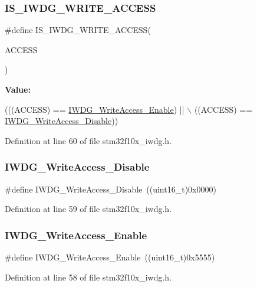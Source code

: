 \subsubsection{\texorpdfstring{I\+S\+\_\+\+I\+W\+D\+G\+\_\+\+W\+R\+I\+T\+E\+\_\+\+A\+C\+C\+E\+SS}{IS\_IWDG\_WRITE\_ACCESS}}
{\footnotesize\ttfamily \#define I\+S\+\_\+\+I\+W\+D\+G\+\_\+\+W\+R\+I\+T\+E\+\_\+\+A\+C\+C\+E\+SS(\begin{DoxyParamCaption}\item[{}]{A\+C\+C\+E\+SS }\end{DoxyParamCaption})}

{\bfseries Value\+:}
\begin{DoxyCode}
(((ACCESS) == \hyperlink{group___i_w_d_g___write_access_ga86f4b926f4351e19ea069f98c2e65f91}{IWDG\_WriteAccess\_Enable}) || \(\backslash\)
                                      ((ACCESS) == \hyperlink{group___i_w_d_g___write_access_ga4b395cf5b2d7ab18fc71a5f779f758cc}{IWDG\_WriteAccess\_Disable}))
\end{DoxyCode}


Definition at line 60 of file stm32f10x\+\_\+iwdg.\+h.

\mbox{\label{group___i_w_d_g___write_access_ga4b395cf5b2d7ab18fc71a5f779f758cc}} 
\subsubsection{\texorpdfstring{I\+W\+D\+G\+\_\+\+Write\+Access\+\_\+\+Disable}{IWDG\_WriteAccess\_Disable}}
{\footnotesize\ttfamily \#define I\+W\+D\+G\+\_\+\+Write\+Access\+\_\+\+Disable~((uint16\+\_\+t)0x0000)}



Definition at line 59 of file stm32f10x\+\_\+iwdg.\+h.

\mbox{\label{group___i_w_d_g___write_access_ga86f4b926f4351e19ea069f98c2e65f91}} 
\subsubsection{\texorpdfstring{I\+W\+D\+G\+\_\+\+Write\+Access\+\_\+\+Enable}{IWDG\_WriteAccess\_Enable}}
{\footnotesize\ttfamily \#define I\+W\+D\+G\+\_\+\+Write\+Access\+\_\+\+Enable~((uint16\+\_\+t)0x5555)}



Definition at line 58 of file stm32f10x\+\_\+iwdg.\+h.

